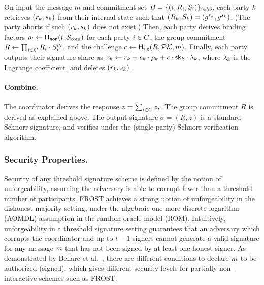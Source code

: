 On input the message $m$ and commitment set $B = \{ (i, R_i, S_i) \}_{i \in \S}$,
each party $k$ retrieves $(r_{k}, s_{k})$ from their internal state such that $(R_k, S_k) = (g^{r_{k}}, g^{s_{k}})$.
(The party aborts if such $(r_{k}, s_{k})$ does not exist.)
Then, each party derives binding factors $\rho_i \gets \mathsf{H_{non}}(i, \mathcal{S}_{\rm com})$ for each party $i \in C$, the group commitment $R \gets \prod_{i \in C} R_{i} \cdot  S_{i}^{\rho_i}$, and the challenge
$c \gets \mathsf{H_{sig}}(R, \mathcal{PK}, m)$.
Finally, each party outputs their signature share as
$z_k \gets r_{k} + s_{k} \cdot \rho_k + c \cdot \mathsf{sk}_k \cdot \lambda_k$,
where $\lambda_k$ is the Lagrange coefficient,
and deletes $(r_{k}, s_{k})$.


\paragraph{Combine.}
The coordinator derives the response $z = \sum_{i \in C} z_i$.
The group commitment $R$ is derived as explained above.
The output signature $\sigma = (R,z)$ is a standard Schnorr signature,
and verifies under the (single-party) Schnorr verification algorithm.

\subsubsection{Security Properties.}
Security of any threshold signature scheme is defined by the notion of unforgeability,
assuming the adversary is able to corrupt fewer than a threshold number of participants.
FROST achieves a strong notion of unforgeability in the dishonest majority setting,
under the algebraic one-more discrete logarithm (AOMDL) assumption in the random oracle model (ROM).
Intuitively, unforgeability in a threshold signature setting guarantees that an adversary which corrupts the coordinator and up to $t-1$ signers cannot generate a valid signature for any message $m$ that has not been signed by at least one honest signer.
As demonstrated by Bellare et al.~\cite{BellareCKMTZ22}, there are different conditions to declare $m$ to be authorized (signed),
which gives different security levels for partially non-interactive schemes such as FROST.


